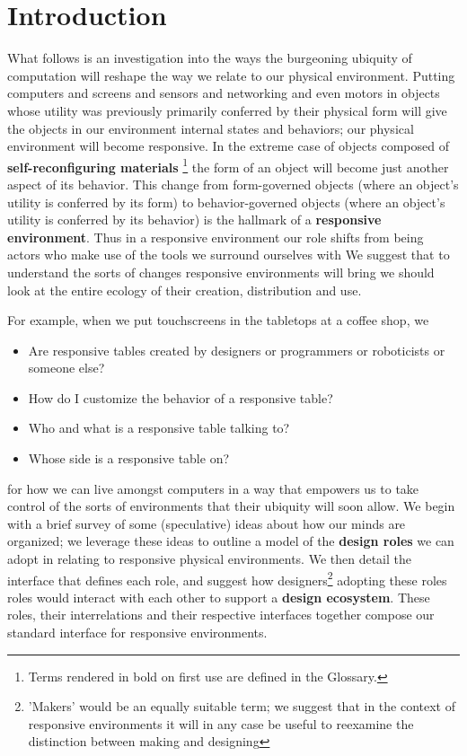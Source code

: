 \section{Introduction}
%
What follows is an investigation into the ways the burgeoning ubiquity of computation will reshape the way we relate to our physical environment.
Putting computers and screens and sensors and networking and even motors in objects whose utility was previously primarily conferred by their physical form will give the objects in our environment internal states and behaviors; our physical environment will become responsive.
In the extreme case of objects composed of {\bf self-reconfiguring materials}%
\footnote{Terms rendered in bold on first use are defined in the Glossary.}%
the form of an object will become just another aspect of its behavior.
This change from form-governed objects (where an object's utility is conferred by its form) to behavior-governed objects (where an object's utility is conferred by its behavior) is the hallmark of a {\bf responsive environment}.
Thus in a responsive environment our role shifts from being actors who make use of the tools we surround ourselves with
We suggest that to understand the sorts of changes responsive environments will bring we should look at the entire ecology of their creation, distribution and use.

For example, when we put touchscreens in the tabletops at a coffee shop, we 
\begin{itemize}
\item Are responsive tables created by designers or programmers or roboticists or someone else?
\item How do I customize the behavior of a responsive table?
\item Who and what is a responsive table talking to?
\item Whose side is a responsive table on?
\end{itemize}
for how we can live amongst computers in a way that empowers us to take control of the sorts of environments that their ubiquity will soon allow. 
We begin with a brief survey of some (speculative) ideas about how our minds are organized; we leverage these ideas to outline a model of the {\bf design roles} we can adopt in relating to responsive physical environments.
We then detail the interface that defines each role, and suggest how designers\footnote{'Makers' would be an equally suitable term; we suggest that in the context of responsive environments it will in any case be useful to reexamine the distinction between making and designing} adopting these roles roles would interact with each other to support a {\bf design ecosystem}.
These roles, their interrelations and their respective interfaces together compose our standard interface for responsive environments.

